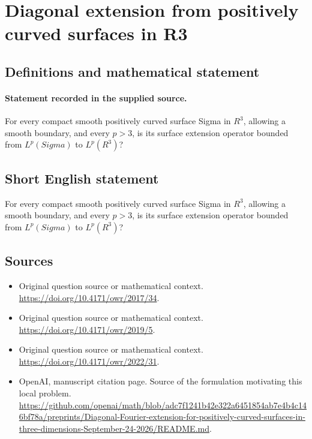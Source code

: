 \documentclass[11pt]{article}
\begin{document}
\section*{Diagonal extension from positively curved surfaces in R3}\label{statement}
\subsection{Definitions and mathematical statement}
\paragraph{Statement recorded in the supplied source.}
For every compact smooth positively curved surface Sigma in $R^3$, allowing a smooth boundary, and every $p>3$, is its surface extension operator bounded from $L^p(Sigma)$ to $L^p(R^3)$?
\subsection{Short English statement}
For every compact smooth positively curved surface Sigma in $R^3$, allowing a smooth boundary, and every $p>3$, is its surface extension operator bounded from $L^p(Sigma)$ to $L^p(R^3)$?
\subsection{Sources}
\begin{itemize}
\item[S1] Original question source or mathematical context.
\url{https://doi.org/10.4171/owr/2017/34}.
\item[S2] Original question source or mathematical context.
\url{https://doi.org/10.4171/owr/2019/5}.
\item[S3] Original question source or mathematical context.
\url{https://doi.org/10.4171/owr/2022/31}.
\item[S4] OpenAI, manuscript citation page. Source of the formulation motivating this local problem.
\url{https://github.com/openai/math/blob/adc7f1241b42e322a6451854ab7e4b4c146bf78a/preprints/Diagonal-Fourier-extension-for-positively-curved-surfaces-in-three-dimensions-September-24-2026/README.md}.
\end{itemize}
\end{document}
